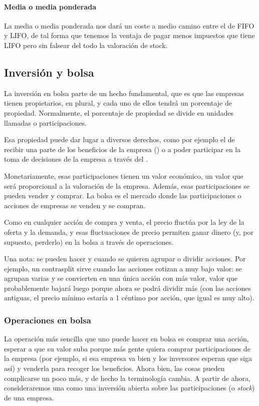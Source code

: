 \documentclass[nochap,palatino,notitlepage]{apuntes}
\begin{document}
\paragraph{Media o media ponderada} La media o media ponderada nos dará un coste a medio camino entre el de FIFO y LIFO, de tal forma que tenemos la ventaja de pagar menos impuestos que tiene LIFO pero sin falsear del todo la valoración de stock.

\subsection{Inversión y bolsa}

La inversión en bolsa parte de un hecho fundamental, que es que las empresas tienen propietarios, en plural, y cada uno de ellos tendrá un porcentaje de propiedad. Normalmente, el porcentaje de propiedad se divide en unidades llamadas  o participaciones.

Esa propiedad puede dar lugar a diversos derechos, como por ejemplo el de recibir una parte de los beneficios de la empresa () o a poder participar en la toma de decisiones de la empresa a través del .

Monetariamente, esas participaciones tienen un valor económico, un valor que será proporcional a la valoración de la empresa. Además, esas participaciones se pueden vender y comprar. La bolsa es el mercado donde las participaciones o acciones de empresas se venden y se compran.

Como en cualquier acción de compra y venta, el precio fluctúa por la ley de la oferta y la demanda, y esas fluctuaciones de precio permiten ganar dinero (y, por supuesto, perderlo) en la bolsa a través de operaciones.

Una nota: se pueden hacer  y  cuando se quieren agrupar o dividir acciones. Por ejemplo, un contrasplit sirve cuando las acciones cotizan a muy bajo valor: se agrupan varias y se convierten en una única acción con más valor, valor que probablemente bajará luego porque ahora se podrá dividir más (con las acciones antiguas, el precio mínimo estaría a 1 céntimo por acción, que igual es muy alto).

\subsubsection{Operaciones en bolsa}

La operación más sencilla que uno puede hacer en bolsa es comprar una acción, esperar a que su valor suba porque más gente quiera comprar participaciones de la empresa (por ejemplo, si esa empresa va bien y los inversores esperan que siga así) y venderla para recoger los beneficios. Ahora bien, las cosas pueden complicarse un poco más, y de hecho la terminología cambia. A partir de ahora, consideraremos una  como una inversión abierta sobre las participaciones (o \textit{stock}) de una empresa.
\end{document}
